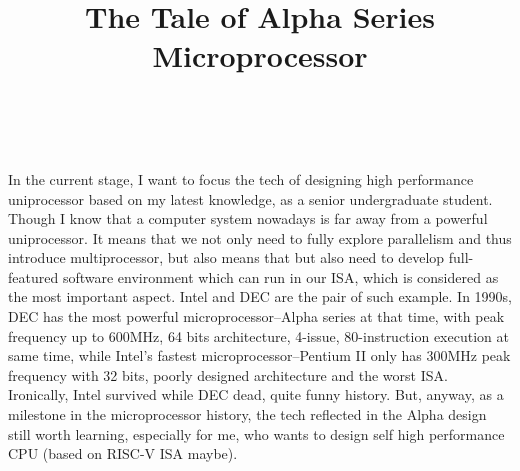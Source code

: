 \documentclass[11pt]{article}
\title{The Tale of Alpha Series Microprocessor}
\author{\Name \\ \Email}
\begin{document}
\maketitle

In the current stage, I want to focus the tech of designing high performance uniprocessor based on my latest knowledge, as a senior undergraduate student. Though I know that a computer system nowadays is far away from a powerful uniprocessor. It means that we not only need to fully explore parallelism and thus introduce multiprocessor, but also means that but also need to develop full-featured software environment which can run in our ISA, which is considered as the most important aspect. Intel and DEC are the pair of such example. In 1990s, DEC has the most powerful microprocessor--Alpha series at that time, with peak frequency up to 600MHz, 64 bits architecture, 4-issue, 80-instruction execution at same time, while Intel's fastest microprocessor--Pentium II only has 300MHz peak frequency with 32 bits, poorly designed architecture and the worst ISA. Ironically, Intel survived while DEC dead, quite funny history. But, anyway, as a milestone in the microprocessor history, the tech reflected in the Alpha design still worth learning, especially for me, who wants to design self high performance CPU (based on RISC-V ISA maybe).   

\renewcommand{\labelenumi}{\Roman{enumi}}
\end{document}
